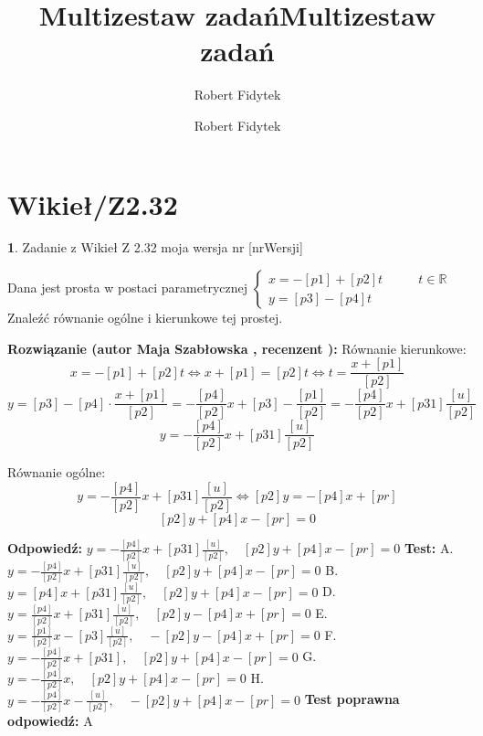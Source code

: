 \documentclass[12pt, a4paper]{article}
\title{Multizestaw zadań}
\author{Robert Fidytek}
\date{}\documentclass[12pt, a4paper]{article}
\title{Multizestaw zadań}
\author{Robert Fidytek}
\date{}
\theoremstyle{definition} %
\newtheorem{zad}{}
\theoremstyle{definition} %
\newtheorem{zad}{}
\newcommand{\kategoria}[1]{\section{#1}} %
\newcommand{\zadStart}[1]{\begin{zad}#1\newline} %
\newcommand{\zadStop}{\end{zad}}   %
\newcommand{\rozwStart}[2]{\noindent \textbf{Rozwiązanie (autor #1 , recenzent #2): }\newline} %
\newcommand{\rozwStop}{\newline}                                            %
\newcommand{\odpStart}{\noindent \textbf{Odpowiedź:}\newline}    %
\newcommand{\odpStop}{\newline}                                             %
\newcommand{\testStart}{\noindent \textbf{Test:}\newline} %
\newcommand{\testStop}{\newline} %
\newcommand{\kluczStart}{\noindent \textbf{Test poprawna odpowiedź:}\newline} %
\newcommand{\kluczStop}{\newline} %
\begin{document}
\maketitle


\kategoria{Wikieł/Z2.32}
\zadStart{Zadanie z Wikieł Z 2.32 moja wersja nr [nrWersji]}

Dana jest prosta w postaci parametrycznej $\left\{ \begin{array}{ll}
x=-[p1]+[p2]t & \quad \quad t\in\mathbb{R}\\
y=[p3]-[p4]t
\end{array} \right.$ Znaleźć równanie ogólne i kierunkowe tej prostej.

\zadStop

\rozwStart{Maja Szabłowska}{}
Równanie kierunkowe:
$$x=-[p1]+[p2]t \iff x+[p1]=[p2]t \iff t=\frac{x+[p1]}{[p2]}$$
$$y=[p3]-[p4]\cdot \frac{x+[p1]}{[p2]}=-\frac{[p4]}{[p2]}x+[p3]-\frac{[p1]}{[p2]}=-\frac{[p4]}{[p2]}x+[p31]\frac{[u]}{[p2]}$$
$$y=-\frac{[p4]}{[p2]}x+[p31]\frac{[u]}{[p2]}$$

Równanie ogólne:
$$y=-\frac{[p4]}{[p2]}x+[p31]\frac{[u]}{[p2]} \iff [p2]y=-[p4]x+[pr]$$
$$[p2]y+[p4]x-[pr]=0$$

\rozwStop


\odpStart
$y=-\frac{[p4]}{[p2]}x+[p31]\frac{[u]}{[p2]}, \quad [p2]y+[p4]x-[pr]=0$
\odpStop
\testStart
A.$y=-\frac{[p4]}{[p2]}x+[p31]\frac{[u]}{[p2]}, \quad [p2]y+[p4]x-[pr]=0$
B.$y=[p4]x+[p31]\frac{[u]}{[p2]}, \quad [p2]y+[p4]x-[pr]=0$
D.$y=\frac{[p4]}{[p2]}x+[p31]\frac{[u]}{[p2]}, \quad [p2]y-[p4]x+[pr]=0$
E.$y=\frac{[p1]}{[p2]}x-[p3]\frac{[u]}{[p2]}, \quad -[p2]y-[p4]x+[pr]=0$
F.$y=-\frac{[p4]}{[p2]}x+[p31], \quad [p2]y+[p4]x-[pr]=0$
G.$y=-\frac{[p4]}{[p2]}x, \quad [p2]y+[p4]x-[pr]=0$
H.$y=-\frac{[p4]}{[p2]}x-\frac{[u]}{[p2]}, \quad -[p2]y+[p4]x-[pr]=0$
\testStop
\kluczStart
A
\kluczStop
\end{document}
